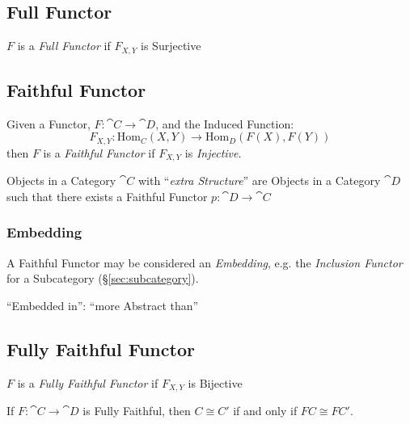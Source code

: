 \subsection{Full Functor}\label{sec:full_functor}

$F$ is a \emph{Full Functor} if $F_{X,Y}$ is Surjective



\subsection{Faithful Functor}\label{sec:faithful_functor}

Given a Functor, $F : \cat{C} \rightarrow \cat{D}$, and the Induced Function:
\[
  F_{X,Y} : \mathrm{Hom}_C(X,Y) \rightarrow \mathrm{Hom}_D(F(X),F(Y))
\]
then $F$ is a \emph{Faithful Functor} if $F_{X,Y}$ is \emph{Injective}.

Objects in a Category $\cat{C}$ with ``\emph{extra Structure}'' are Objects in a
Category $\cat{D}$ such that there exists a Faithful Functor
$p : \cat{D} \rightarrow \cat{C}$



\subsubsection{Embedding}\label{sec:category_embedding}

A Faithful Functor may be considered an \emph{Embedding}, e.g. the
\emph{Inclusion Functor} for a Subcategory (\S\ref{sec:subcategory}).

``Embedded in'': ``more Abstract than''



\subsection{Fully Faithful Functor}\label{sec:fully_faithful}

$F$ is a \emph{Fully Faithful Functor} if $F_{X,Y}$ is Bijective

If $F : \cat{C} \rightarrow \cat{D}$ is Fully Faithful, then $C
\cong C'$ if and only if $FC \cong FC'$.

